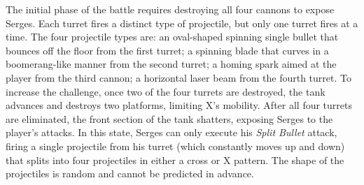 The initial phase of the battle requires destroying all four cannons to expose Serges. Each turret fires a distinct type of projectile, but only one turret fires at a time. The four projectile types are: an oval-shaped spinning single bullet that bounces off the floor from the first turret; a spinning blade that curves in a boomerang-like manner from the second turret; a homing spark aimed at the player from the third cannon; a horizontal laser beam from the fourth turret. To increase the challenge, once two of the four turrets are destroyed, the tank advances and destroys two platforms, limiting X's mobility. After all four turrets are eliminated, the front section of the tank shatters, exposing Serges to the player's attacks. In this state, Serges can only execute his \emph{Split Bullet} attack, firing a single projectile from his turret (which constantly moves up and down) that splits into four projectiles in either a cross or X pattern. The shape of the projectiles is random and cannot be predicted in advance.

